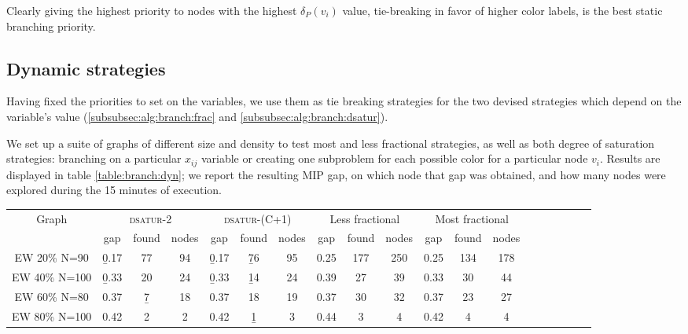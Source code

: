 Clearly giving the highest priority to nodes with the highest $\delta_P(v_i)$ value, tie-breaking in favor of higher color labels, is the best static branching priority.

\subsection{Dynamic strategies}

Having fixed the priorities to set on the variables, we use them as tie breaking strategies for the two devised strategies which depend on the variable's value (\ref{subsubsec:alg:branch:frac} and \ref{subsubsec:alg:branch:dsatur}). 

We set up a suite of graphs of different size and density to test most and less fractional strategies, as well as both degree of saturation strategies: branching on a particular $x_{ij}$ variable or creating one subproblem for each possible color for a particular node $v_i$. Results are displayed in table \ref{table:branch:dyn}; we report the resulting MIP gap, on which node that gap was obtained, and how many nodes were explored during the 15 minutes of execution.

\begin{sidewaystable}
\centering

\begin{tabular}{|c|ccc|ccc|ccc|ccc|ccc|ccc|}
\hline
\multicolumn{1}{|c|}{Graph} & \multicolumn{3}{|c|}{\textsc{dsatur-2}} & \multicolumn{3}{|c|}{\textsc{dsatur-(C+1)}} & \multicolumn{3}{|c|}{Less fractional} & \multicolumn{3}{|c|}{Most fractional} 
\\
 & gap & found & nodes & gap & found & nodes & gap & found & nodes & gap & found & nodes
\\
\hline
EW 20\% N=90 & \b{0.17} & 77 & 94 & \b{0.17} & \b{76} & 95 & 0.25 & 177 & 250 & 0.25 & 134 & 178 
\\
EW 40\% N=100 & \b{0.33} & 20 & 24 & \b{0.33} & \b{14} & 24 & 0.39 & 27 & 39 & 0.33 & 30 & 44 
\\
EW 60\% N=80 & 0.37 & \b{7} & 18 & 0.37 & 18 & 19 & 0.37 & 30 & 32 & 0.37 & 23 & 27 
\\
EW 80\% N=100 & 0.42 & 2 & 2 & 0.42 & \b{1} & 3 & 0.44 & 3 & 4 & 0.42 & 4 & 4
\\
\hline 
 \end{tabular}

\caption{Results for fractional and degree of saturation (spanning either $2$ or $C+1$ subproblems) branching strategies on branch and bound schemes. Data reported is MIP gap after $15$ minutes of execution, on which node (in thousands) that gap was found, and how many nodes (in thousands) were explored in total.}
\label{table:branch:dyn}

\end{sidewaystable}


